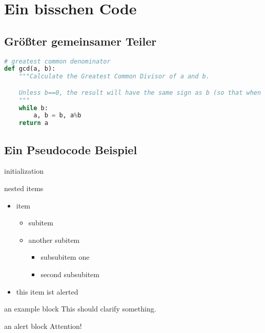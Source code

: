\section{Ein bisschen Code}
\subsection{Größter gemeinsamer Teiler}
\begin{frame}[fragile]
    \begin{lstlisting}[language=python,caption=GCD in python3]
# greatest common denominator
def gcd(a, b):
    """Calculate the Greatest Common Divisor of a and b.

    Unless b==0, the result will have the same sign as b (so that when b is divided by it, the result comes out positive).
    """
    while b:
        a, b = b, a%b
    return a
    \end{lstlisting}
\end{frame}

\subsection{Ein Pseudocode Beispiel}
\begin{frame}
    \begin{algorithm}[H]
    \SetAlgoLined
    initialization\;
     \caption{How to write algorithms}
    \end{algorithm}
\end{frame}

\begin{frame}{nested items}
    \begin{itemize}
        \item item
        \begin{itemize}
            \item subitem
            \item another subitem
            \begin{itemize}
                \item subsubitem one
                \item second subsubitem
            \end{itemize}
        \end{itemize}
        \item this item ist \alert{alerted}
    \end{itemize}

    \begin{exampleblock}{an example block}
        This should clarify something.
    \end{exampleblock}

    \begin{alertblock}{an alert block}
        Attention!
    \end{alertblock}
\end{frame}

